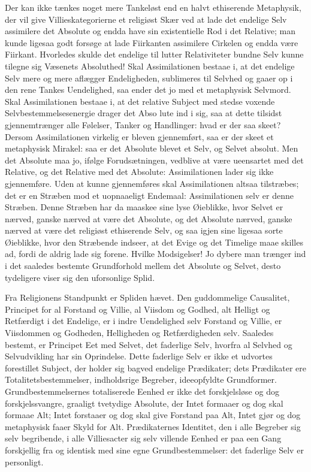 \documentclass[12pt]{book}
\begin{document}
Der kan ikke tænkes noget mere Tankeløst end en halvt ethiserende
Metaphysik, der vil give Villieskategorierne et religiøst Skær ved
at lade det endelige Selv assimilere det Absolute og endda have sin
existentielle Rod i det Relative; man kunde ligesaa godt forsøge at
lade Fiirkanten assimilere Cirkelen og endda være Fiirkant.
Hvorledes skulde det endelige til lutter Relativiteter bundne Selv
kunne tilegne sig Væsenets Absoluthed! Skal Assimilationen bestaae
i, at det endelige Selv mere og mere aflægger Endeligheden,
sublimeres til Selvhed og gaaer op i den rene Tankes Uendelighed,
saa ender det jo med et metaphysisk Selvmord. Skal Assimilationen
bestaae i, at det relative Subject med stedse voxende
Selvbestemmelsesenergie drager det Abso\-
lute ind i sig, saa at dette tilsidst gjennemtrænger alle Følelser,
Tanker og Handlinger: hvad er der saa skeet? Dersom Assimilationen
virkelig er bleven gjennemført, saa er der skeet et metaphysisk
Mirakel: saa er det Absolute blevet et Selv, og Selvet absolut. Men
det Absolute maa jo, ifølge Forudsætningen, vedblive at være
ueensartet med det Relative, og det Relative med det Absolute:
Assimilationen lader sig ikke gjennemføre. Uden at kunne
gjennemføres skal Assimilationen altsaa tilstræbes; det er en
Stræben mod et uopnaaeligt Endemaal: Assimilationen selv er denne
Stræben. Denne Stræben har da maaskee sine lyse Øieblikke, hvor
Selvet er nærved, ganske nærved at være det Absolute, og det
Absolute nærved, ganske nærved at være det religiøst ethiserende
Selv, og saa igjen sine ligesaa sorte Øieblikke, hvor den Stræbende
indseer, at det Evige og det Timelige maae skilles ad, fordi de
aldrig lade sig forene. Hvilke Modsigelser! Jo dybere man trænger
ind i det saaledes bestemte Grundforhold mellem det Absolute og
Selvet, desto tydeligere viser sig den uforsonlige Splid.

Fra Religionens Standpunkt er Spliden hævet. Den guddommelige
Causalitet, Principet for al Forstand og Villie, al Viisdom og
Godhed, alt Helligt og Retfærdigt i det Endelige, er i indre
Uendelighed selv Forstand og Villie, er Viisdommen og Godheden,
Helligheden og Retfærdigheden selv. Saaledes bestemt, er Principet
Eet med Selvet, det faderlige Selv, hvorfra al Selvhed og
Selvudvikling har sin Oprindelse. Dette faderlige Selv er ikke et
udvortes forestillet Subject, der holder sig bagved endelige
Prædikater; dets Prædikater ere Totalitetsbestemmelser,
indholdsrige Begreber, ideeopfyldte Grundformer.
Grundbestemmelsernes totaliserede Eenhed er ikke det forskjelsløse
og dog forskjelssvangre, graaligt tvetydige Absolute, der Intet
formaaer og dog skal formaae Alt; Intet forstaaer og dog skal give
Forstand paa
Alt, Intet gjør og dog metaphysisk faaer Skyld for Alt.
Prædikaternes Identitet, den i alle Begreber sig selv begribende, i
alle Villiesacter sig selv villende Eenhed er paa een Gang
forskjellig fra og identisk med sine egne Grundbestemmelser: det
faderlige Selv er personligt.
\end{document}
